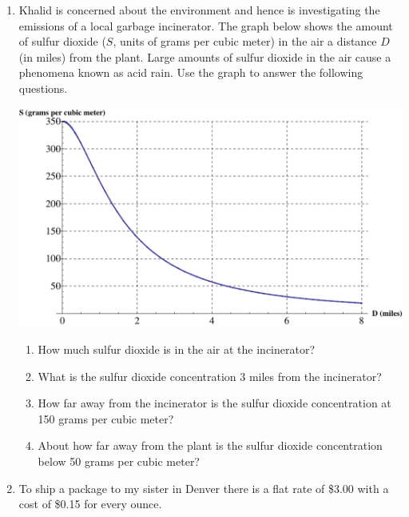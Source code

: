 \documentclass[12pt]{article}
\begin{document}
\hrulefill


\newpage

\begin{enumerate}
\item Khalid is concerned about the environment and hence is investigating the emissions of a local garbage incinerator.  The graph below shows the amount of sulfur dioxide ($S$, units of grams per cubic meter) in the air a distance $D$ (in miles) from the plant. Large amounts of sulfur dioxide in the air cause a phenomena known as acid rain. Use the graph to answer the following questions.

\begin{center}
 {\includegraphics [width = 8in] {garbageEmissions_A}}
\end{center}



\begin{enumerate}
\item How much sulfur dioxide is in the air at the incinerator?
\vfill
\item What is the sulfur dioxide concentration 3 miles from the incinerator?
\vfill
\item How far away from the incinerator is the sulfur dioxide concentration at 150 grams per cubic meter?
\vfill
\item About how far away from the plant is the sulfur dioxide concentration below 50 grams per cubic meter?
\vfill
\end{enumerate}

\newpage
\item  To ship a package to my sister in Denver there is a flat rate of \$3.00 with a cost of \$0.15 for every ounce.  


\end{enumerate}
\end{document}
